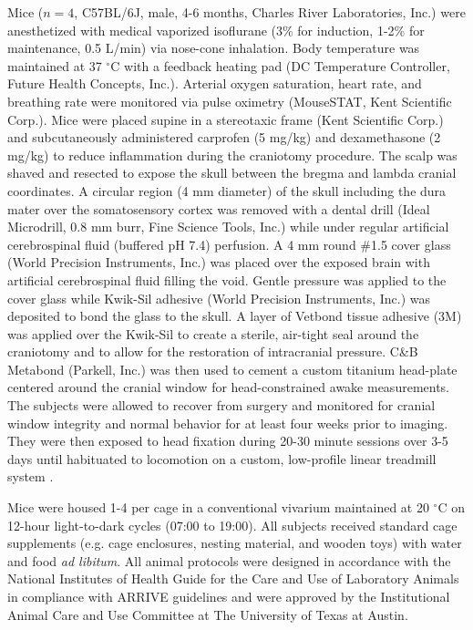\documentclass[review]{elsarticle}
\begin{document}
Mice ($n = 4$, C57BL/6J, male, 4-6 months, Charles River Laboratories, Inc.) were anesthetized with medical  vaporized isoflurane (3\% for induction, 1-2\% for maintenance, 0.5 L/min) via nose-cone inhalation. Body temperature was maintained at 37 $^\circ$C with a feedback heating pad (DC Temperature Controller, Future Health Concepts, Inc.). Arterial oxygen saturation, heart rate, and breathing rate were monitored via pulse oximetry (MouseSTAT, Kent Scientific Corp.). Mice were placed supine in a stereotaxic frame (Kent Scientific Corp.) and subcutaneously administered carprofen (5 mg/kg) and dexamethasone (2 mg/kg) to reduce inflammation during the craniotomy procedure. The scalp was shaved and resected to expose the skull between the bregma and lambda cranial coordinates. A circular region (4 mm diameter) of the skull including the dura mater over the somatosensory cortex was removed with a dental drill (Ideal Microdrill, 0.8 mm burr, Fine Science Tools, Inc.) while under regular artificial cerebrospinal fluid (buffered pH 7.4) perfusion. A 4 mm round \#1.5 cover glass (World Precision Instruments, Inc.) was placed over the exposed brain with artificial cerebrospinal fluid filling the void. Gentle pressure was applied to the cover glass while Kwik-Sil adhesive (World Precision Instruments, Inc.) was deposited to bond the glass to the skull. A layer of Vetbond tissue adhesive (3M) was applied over the Kwik-Sil to create a sterile, air-tight seal around the craniotomy and to allow for the restoration of intracranial pressure. C\&B Metabond (Parkell, Inc.) was then used to cement a custom titanium head-plate centered around the cranial window for head-constrained awake measurements. The subjects were allowed to recover from surgery and monitored for cranial window integrity and normal behavior for at least four weeks prior to imaging. They were then exposed to head fixation during 20-30 minute sessions over 3-5 days until habituated to locomotion on a custom, low-profile linear treadmill system \cite{He:2020}.

Mice were housed 1-4 per cage in a conventional vivarium maintained at 20 $^\circ$C on 12-hour light-to-dark cycles (07:00 to 19:00). All subjects received standard cage supplements (e.g. cage enclosures, nesting material, and wooden toys) with water and food \textit{ad libitum}. All animal protocols were designed in accordance with the National Institutes of Health Guide for the Care and Use of Laboratory Animals in compliance with ARRIVE guidelines and were approved by the Institutional Animal Care and Use Committee at The University of Texas at Austin.
\end{document}
